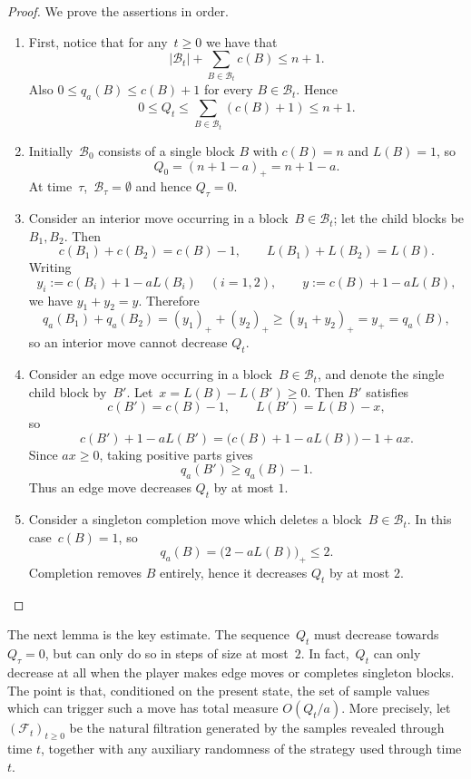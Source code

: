 \documentclass[11pt,reqno,letterpaper]{amsart}
\theoremstyle{definition}
\numberwithin{equation}{section}
\newcommand{\cB}{\mathcal{B}}
\begin{document}
\begin{proof}
We prove the assertions in order. 
\begin{enumerate}
    \item First, notice that for any~$t \geq 0$ we have that
    \[
    |\cB_t| + \sum_{B \in \cB_t} c(B) \leq n+1.
    \]
    Also \(0\le q_a(B)\le c(B)+1\) for every \(B\in\cB_t\).
Hence
\[
0\le Q_t\le \sum_{B\in\cB_t}(c(B)+1)\le n+1.
\]
\item Initially~$\cB_0$ consists of a single block $B$ with $c(B)=n$ and $L(B)=1$, so
\[
Q_0= (n+1-a)_+ = n+1-a.
\]
At time~$\tau$,~$\cB_\tau = \emptyset$ and hence $Q_\tau=0$.
\item Consider an interior move occurring in a block~$B \in \cB_t$; let the child blocks be $B_1,B_2$. Then
\[
c(B_1)+c(B_2)=c(B) - 1,\qquad L(B_1)+L(B_2)=L(B).
\]
Writing
\[
y_i:=c(B_i)+1-aL(B_i)\quad (i=1,2),\qquad y:=c(B)+1-aL(B),
\]
we have $y_1+y_2=y$. Therefore
\[
q_a(B_1)+q_a(B_2)
= (y_1)_+ + (y_2)_+
\ge (y_1 + y_2)_+
= y_+
= q_a(B),
\]
so an interior move cannot decrease $Q_t$.

\item Consider an edge move occurring in a block~$B \in \cB_t$, and denote the single child block by~$B'$. Let~$x = L(B) - L(B')\geq 0$. Then $B'$ satisfies
\[
c(B')=c(B)-1,\qquad L(B')=L(B)-x,
\]
so
\begin{equation}\label{eq:change-in-q}
c(B')+1-aL(B')=\bigl(c(B)+1-aL(B)\bigr)-1+ax.
\end{equation}
Since \(ax\ge0\), taking positive parts gives
\[
q_a(B')\ge q_a(B)-1.
\]
Thus an edge move decreases \(Q_t\) by at most \(1\).

\item Consider a singleton completion move which deletes a block~$B \in \cB_t$. In this case~$c(B)=1$, so
\[
q_a(B)=\bigl(2-aL(B)\bigr)_+\le 2.
\]
Completion removes $B$ entirely, hence it decreases $Q_t$ by at most $2$. \qedhere
\end{enumerate}
\end{proof}


The next lemma is the key estimate. The sequence~$Q_t$ must decrease towards~$Q_\tau = 0$, but can only do so in steps of size at most~$2$. In fact,~$Q_t$ can only decrease at all when the player makes edge moves or completes singleton blocks. The point is that, conditioned on the present state, the set of sample values which can trigger such a move has total measure \(O(Q_t/a)\). More precisely, let  $(\mathcal{F}_t)_{t\ge 0}$ be the natural filtration generated by the samples revealed through time \(t\), together with any auxiliary randomness of the strategy used through time \(t\).
\end{document}
